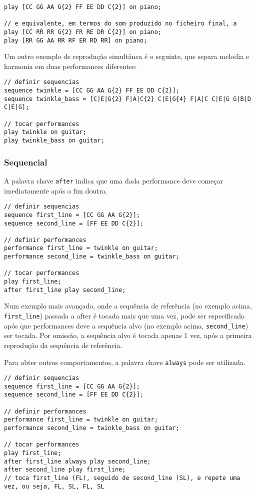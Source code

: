 \documentclass{article}
\begin{document}
\begin{lstlisting} 
play [CC GG AA G{2} FF EE DD C{2}] on piano;

// e equivalente, em termos do som produzido no ficheiro final, a
play [CC RR RR G{2} FR RE DR C{2}] on piano;
play [RR GG AA RR RF ER RD RR] on piano;
\end{lstlisting}

Um outro exemplo de reprodução simultânea é o seguinte, que separa melodia e harmonia em duas performances diferentes:
\begin{lstlisting} 
// definir sequencias
sequence twinkle = [CC GG AA G{2} FF EE DD C{2}];
sequence twinkle_bass = [C|E|G{2} F|A|C{2} C|E|G{4} F|A|C C|E|G G|B|D C|E|G];

// tocar performances
play twinkle on guitar;
play twinkle_bass on guitar;
\end{lstlisting}

\subsubsection{Sequencial}
A palavra chave \texttt{after} indica que uma dada performance deve começar imediatamente após o fim doutra.
\begin{lstlisting} 
// definir sequencias
sequence first_line = [CC GG AA G{2}];
sequence second_line = [FF EE DD C{2}];

// definir performances
performance first_line = twinkle on guitar;
performance second_line = twinkle_bass on guitar;

// tocar performances
play first_line;
after first_line play second_line;
\end{lstlisting}

Num exemplo mais avançado, onde a sequência de referência (no exemplo acima, \texttt{first\_line}) passada a after é tocada mais que uma vez, pode ser especificado após que performances deve a sequência alvo (no exemplo acima, \texttt{second\_line}) ser tocada. Por omissão, a sequência alvo é tocada apenas 1 vez, após a primeira reprodução da sequência de referência. 

Para obter outros comportamentos, a palavra chave \texttt{always} pode ser utilizada.

\begin{lstlisting} 
// definir sequencias
sequence first_line = [CC GG AA G{2}];
sequence second_line = [FF EE DD C{2}];

// definir performances
performance first_line = twinkle on guitar;
performance second_line = twinkle_bass on guitar;

// tocar performances
play first_line;
after first_line always play second_line;
after second_line play first_line;
// toca first_line (FL), seguido de second_line (SL), e repete uma vez, ou seja, FL, SL, FL, SL
\end{lstlisting}
\end{document}
